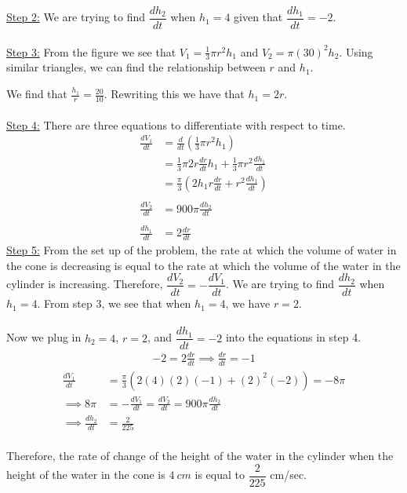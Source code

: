 \documentclass[11pt]{exam}
\begin{document}
\begin{questions}
\begin{solution}
\underline{Step 2:} We are trying to find $\dfrac{dh_{2}}{dt}$ when $h_{1} = 4$ given that $\dfrac{dh_{1}}{dt}=-2$. 
\\
\\
\underline{Step 3:} From the figure we see that $V_{1} = \frac{1}{3}\pi r^2h_{1}$ and $V_{2} = \pi(30)^2h_{2}$. Using similar triangles, we can find the relationship between $r$ and $h_{1}$. 
\\
\begin{center}
\end{center}
We find that $\frac{h_{1}}{r}=\frac{20}{10}$. Rewriting this we have that $h_{1}=2r$. 
\\
\\
\underline{Step 4:} There are three equations to differentiate with respect to time.
\begin{align*}
\frac{dV_{1}}{dt}&=\frac{d}{dt}\left(\frac{1}{3}\pi r^2h_{1}\right)\\
&=\frac{1}{3}\pi2r\frac{dr}{dt}h_{1}+\frac{1}{3}\pi r^2\frac{dh_{1}}{dt}\\
&=\frac{\pi}{3}\left(2h_{1}r\frac{dr}{dt}+r^2\frac{dh_{1}}{dt}\right)\\
\\
\frac{dV_{2}}{dt}&=900\pi\frac{dh_{2}}{dt}
\\
\\
\frac{dh_{1}}{dt}&=2\frac{dr}{dt}
\end{align*}
\underline{Step 5:} From the set up of the problem, the rate at which the volume of water in the cone is decreasing is equal to the rate at which the volume of the water in the cylinder is increasing. Therefore, $\dfrac{dV_{2}}{dt}=-\dfrac{dV_{1}}{dt}$. We are trying to find $\dfrac{dh_{2}}{dt}$ when $h_{1}= 4$. From step 3, we see that when $h_{1} = 4$, we have $r=2$.  
\\
\\Now we plug in $h_{2} = 4$, $r=2$, and $\dfrac{dh_{1}}{dt}=-2$ into the equations in step 4. 
\begin{align*}
-2=2\frac{dr}{dt}\implies \frac{dr}{dt}=-1
\end{align*}
\begin{align*}
\frac{dV_{1}}{dt}&=\frac{\pi}{3}(2(4)(2)(-1)+(2)^2(-2))=-8\pi\\
\implies 8\pi &= -\frac{dV_{1}}{dt}=\frac{dV_{2}}{dt}=900\pi\frac{dh_{2}}{dt}\\
\implies \frac{dh_{2}}{dt}&=\frac{2}{225}
\end{align*}
\\
Therefore, the rate of change of the height of the water in the cylinder when the height of the water in the cone is $4\ cm$ is equal to $\dfrac{2}{225}$ cm/sec.

\end{solution}
\end{questions}
\end{document}

